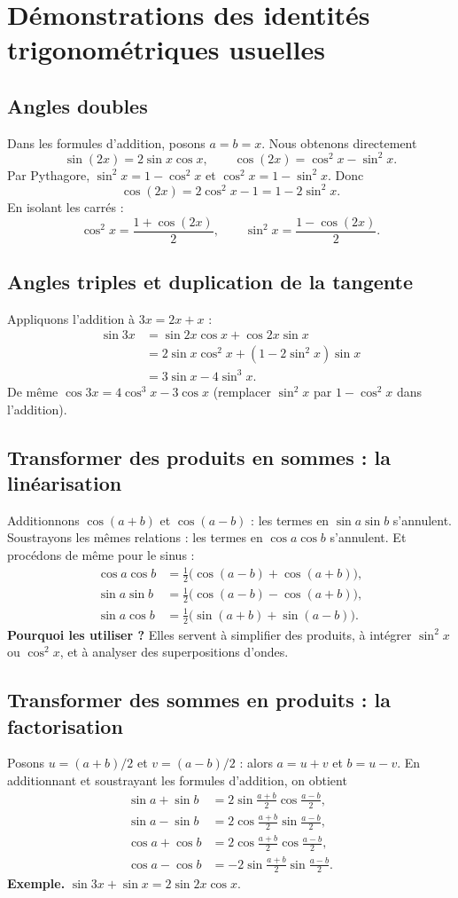 \documentclass[../cours_spe_trigo.tex]{subfiles}
\begin{document}
\setcounter{chapter}{7}
\chapter{Démonstrations des identités trigonométriques usuelles}
\section{Angles doubles}
Dans les formules d'addition, posons $a=b=x$. Nous obtenons directement
\[
\boxed{\sin(2x)=2\sin x\cos x,\qquad \cos(2x)=\cos^2x-\sin^2x.}
\]
Par Pythagore, $\sin^2x=1-\cos^2x$ et $\cos^2x=1-\sin^2x$. Donc
\[
\boxed{\cos(2x)=2\cos^2x-1=1-2\sin^2x.}
\]
En isolant les carrés :
\[\boxed{\cos^2x=\frac{1+\cos(2x)}2,\qquad \sin^2x=\frac{1-\cos(2x)}2.}\]
\section{Angles triples et duplication de la tangente}
Appliquons l'addition à $3x=2x+x$ :
\[
\begin{aligned}
\sin3x&=\sin2x\cos x+\cos2x\sin x\\
&=2\sin x\cos^2x+(1-2\sin^2x)\sin x\\
&=\boxed{3\sin x-4\sin^3x}.
\end{aligned}
\]
De même $\boxed{\cos3x=4\cos^3x-3\cos x}$ (remplacer $\sin^2x$ par $1-\cos^2x$ dans l'addition).

\section{Transformer des produits en sommes : la linéarisation}
Additionnons $\cos(a+b)$ et $\cos(a-b)$ : les termes en $\sin a\sin b$ s'annulent. Soustrayons les mêmes relations : les termes en $\cos a\cos b$ s'annulent. Et procédons de même pour le sinus :
\[
\boxed{\begin{aligned}
\cos a\cos b&=\tfrac12\bigl(\cos(a-b)+\cos(a+b)\bigr),\\
\sin a\sin b&=\tfrac12\bigl(\cos(a-b)-\cos(a+b)\bigr),\\
\sin a\cos b&=\tfrac12\bigl(\sin(a+b)+\sin(a-b)\bigr).
\end{aligned}}
\]
\textbf{Pourquoi les utiliser ?} Elles servent à simplifier des produits, à intégrer $\sin^2x$ ou $\cos^2x$, et à analyser des superpositions d'ondes.
\section{Transformer des sommes en produits : la factorisation}
Posons $u=(a+b)/2$ et $v=(a-b)/2$ : alors $a=u+v$ et $b=u-v$. En additionnant et soustrayant les formules d'addition, on obtient
\[
\boxed{\begin{aligned}
\sin a+\sin b&=2\sin\tfrac{a+b}{2}\cos\tfrac{a-b}{2},\\
\sin a-\sin b&=2\cos\tfrac{a+b}{2}\sin\tfrac{a-b}{2},\\
\cos a+\cos b&=2\cos\tfrac{a+b}{2}\cos\tfrac{a-b}{2},\\
\cos a-\cos b&=-2\sin\tfrac{a+b}{2}\sin\tfrac{a-b}{2}.
\end{aligned}}
\]
\textbf{Exemple.} $\sin3x+\sin x=2\sin2x\cos x$.
\end{document}

